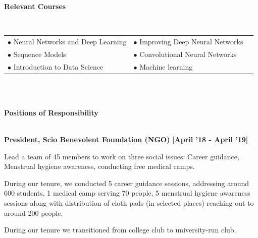 \documentclass[a4paper,10pt]{article}
\begin{document}
\colorbox{titleColor}{\parbox{6.7in}{\textbf{Relevant Courses}}}\\[0.08in]
\begin{tabular}{p{3.5in}p{3in}p{2.5in}}
\hspace{0.9pc}$\bullet$ Neural Networks and Deep Learning &$\bullet$ Improving Deep Neural Networks\\[0.05in]
\hspace{0.9pc}$\bullet$ Sequence Models &$\bullet$ Convolutional Neural Networks\\[0.05in]
\hspace{0.9pc}$\bullet$ Introduction to Data Science&$\bullet$ Machine learning \\[0.05in]
\end{tabular}
\\\\


\colorbox{titleColor}{\parbox{6.7in}{\textbf{Positions of Responsibility}}}\\

\textbf{President, Scio Benevolent Foundation (NGO)}  \hfill {\small{{\textbf{[April '18 - April '19]}}}\/}                        
\begin{itemize*}
\item Lead a team of 45 members to work on three social issues: Career guidance, Menstrual hygiene awareness, conducting free medical camps.
\item During our tenure, we conducted 5 career guidance sessions, addressing around 600 students, 1 medical camp serving 70 people, 5 menstrual hygiene awareness sessions along with distribution of cloth pads (in selected places) reaching out to around 200 people.
\item During our tenure we transitioned from college club to university-run club.
\end{itemize*}
\end{document}
